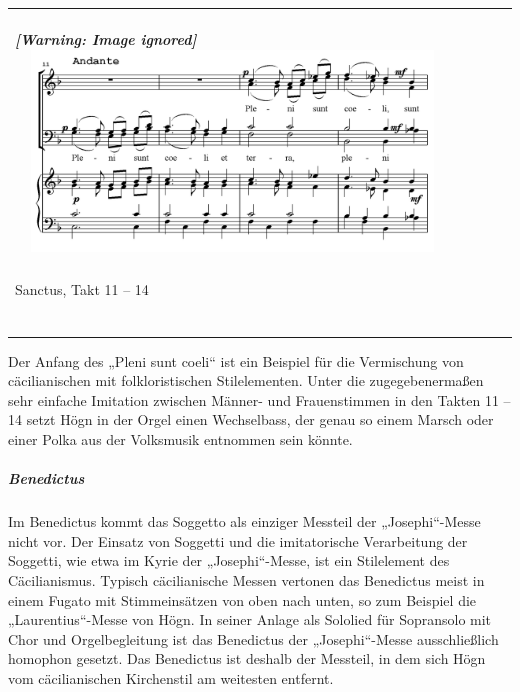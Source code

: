 \begin{center}
\tablefirsthead{}
\tablehead{}
\tabletail{}
\tablelasttail{}
\begin{supertabular}{m{11.689cm}}
\subparagraph[]{  [Warning: Image ignored]
\includegraphics[width=11.506cm,height=5.355cm]{pictures/zulassungsarbeit-img121.png}
 }
Sanctus, Takt 11 – 14\\
\begin{figure}
\img{}
\caption{}
\end{figure}
\end{supertabular}
\end{center}
Der Anfang des „Pleni sunt coeli“ ist ein Beispiel für die Vermischung
von cäcilianischen mit folkloristischen Stilelementen. Unter die
zugegebenermaßen sehr einfache Imitation zwischen Männer- und
Frauenstimmen in den Takten 11 – 14 setzt Högn in der Orgel einen
Wechselbass, der genau so einem Marsch oder einer Polka aus der
Volksmusik entnommen sein könnte.

\subparagraph{Benedictus}
Im Benedictus kommt das Soggetto als einziger Messteil der
„Josephi“-Messe nicht vor. Der Einsatz von Soggetti und die
imitatorische Verarbeitung der Soggetti, wie etwa im Kyrie der
„Josephi“-Messe, ist ein Stilelement des Cäcilianismus. Typisch
cäcilianische Messen vertonen das Benedictus meist in einem Fugato mit
Stimmeinsätzen von oben nach unten, so zum Beispiel die
„Laurentius“-Messe von Högn. In seiner Anlage als Sololied für
Sopransolo mit Chor und Orgelbegleitung ist das Benedictus der
„Josephi“-Messe ausschließlich homophon gesetzt. Das Benedictus ist
deshalb der Messteil, in dem sich Högn vom cäcilianischen Kirchenstil
am weitesten entfernt.

